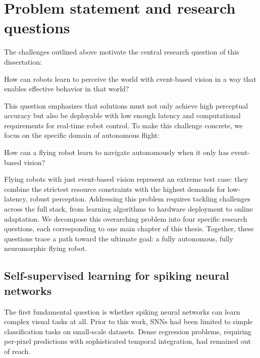 
\section{Problem statement and research questions}

The challenges outlined above motivate the central research question of this dissertation:

\begin{tcolorbox}[title={\textbf{Main Research Question}}]
    How can robots learn to perceive the world with event-based vision in a way that enables effective behavior in that world?
\end{tcolorbox}

This question emphasizes that solutions must not only achieve high perceptual accuracy but also be deployable with low enough latency and computational requirements for real-time robot control. To make this challenge concrete, we focus on the specific domain of autonomous flight:

\begin{tcolorbox}[title={\textbf{Problem Statement}}]
    How can a flying robot learn to navigate autonomously when it only has event-based vision?
\end{tcolorbox}

Flying robots with just event-based vision represent an extreme test case: they combine the strictest resource constraints with the highest demands for low-latency, robust perception. Addressing this problem requires tackling challenges across the full stack, from learning algorithms to hardware deployment to online adaptation. We decompose this overarching problem into four specific research questions, each corresponding to one main chapter of this thesis. Together, these questions trace a path toward the ultimate goal: a fully autonomous, fully neuromorphic flying robot.

\subsection*{Self-supervised learning for spiking neural networks}

The first fundamental question is whether spiking neural networks can learn complex visual tasks at all. Prior to this work, SNNs had been limited to simple classification tasks on small-scale datasets. Dense regression problems, requiring per-pixel predictions with sophisticated temporal integration, had remained out of reach.

